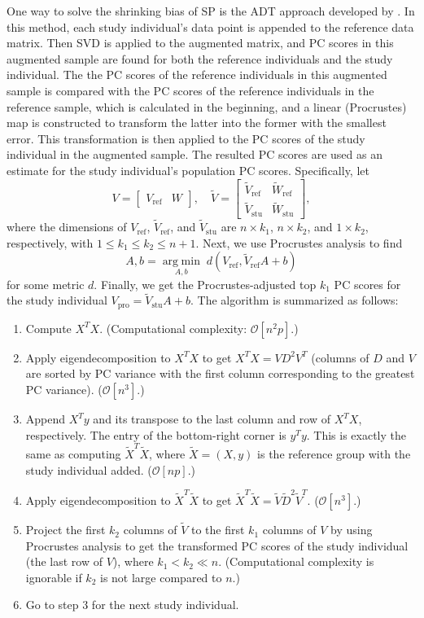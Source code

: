 \documentclass{article}
\newcommand{\bO}{\mathcal{O}}
\newcommand{\argmin}[1]{\underset{#1}{\operatorname{arg\;min}}\;}
\begin{document}
One way to solve the shrinking bias of SP is the ADT approach developed by \cite{wang}.
In this method, each study individual's data point is appended to the reference
data matrix.
Then SVD is applied to the augmented matrix,
and PC scores in this augmented sample are found for both the reference
individuals and the study individual.
The the PC scores of the reference individuals in this augmented sample is
compared with the PC scores of the reference individuals in the reference
sample,
which is calculated in the beginning,
and a linear (Procrustes) map is constructed to transform the latter into the former
with the smallest error.
This transformation is then applied to the PC scores of the study individual in
the augmented sample.
The resulted PC scores are used as an estimate for the study individual's
population PC scores.
Specifically, let
\[
  V =
  \begin{bmatrix}
    V_{\text{ref}} & W
  \end{bmatrix},
  \quad
  \tilde{V} =
  \begin{bmatrix}
    \tilde{V}_{\text{ref}} & \tilde{W}_\text{ref} \\
    \tilde{V}_\text{stu} & \tilde{W}_\text{stu}
  \end{bmatrix},
\]
where the dimensions of $V_\text{ref}$, $\tilde{V}_\text{ref}$, and $\tilde{V}_\text{stu}$ are $n \times k_1$, $n \times k_2$, and $1 \times k_2$, respectively, with $ 1 \leq k_1 \leq k_2 \leq n+1$. 
Next, we use Procrustes analysis to find
\[
  A, b = \argmin{A, b} d(V_\text{ref}, \tilde{V}_{\text{ref}}A+b)
\]
for some metric $d$.
Finally, we get the Procrustes-adjusted top $k_1$ PC scores for the study individual $V_\text{pro} = \tilde{V}_\text{stu} A + b$.
The algorithm is summarized as follows:
\begin{enumerate}
\item Compute $X^T X$.
  (Computational complexity: $\bO[n^2p]$.)  
\item Apply eigendecomposition to $X^T X$ to get $X^T X = V D^2 V^T$ (columns of $D$ and $V$ are sorted by PC variance with the first column corresponding to the greatest PC variance).
  ($\bO[n^3]$.)
\item Append $X^T y$ and its transpose to the last column and row of $X^T X$, respectively.
  The entry of the bottom-right corner is $y^T y$.
  This is exactly the same as computing $\tilde{X}^T \tilde{X}$,
  where $\tilde{X} = (X, y)$ is the reference group with the study individual added.
  ($\bO[np]$.)
\item Apply eigendecomposition to $\tilde{X}^T \tilde{X}$ to get $\tilde{X}^T \tilde{X} = \tilde{V} \tilde{D}^2 \tilde{V}^T$.
  ($\bO[n^3]$.)
\item Project the first $k_2$ columns of $\tilde{V}$ to the first $k_1$ columns of $V$ by using Procrustes analysis to get the transformed PC scores of the study individual (the last row of $V$),
  where $k_1 < k_2 \ll n$.
  (Computational complexity is ignorable if $k_2$ is not large compared to $n$.)
  \item Go to step 3 for the next study individual.
\end{enumerate}
\end{document}
